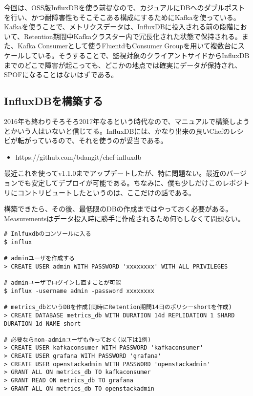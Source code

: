 今回は、OSS版InfluxDBを使う前提なので、カジュアルにDBへのダブルポストを行い、かつ耐障害性もそこそこある構成にするためにKafkaを使っている。Kafkaを使うことで、メトリクスデータは、InfluxDBに投入される前の段階において、Retention期間中Kafkaクラスター内で冗長化された状態で保持される。また、Kafka Consumerとして使うFluentdもConsumer Groupを用いて複数台にスケールしている。そうすることで、監視対象のクライアントサイドからInfluxDBまでのどこで障害が起こっても、どこかの地点では確実にデータが保持され、SPOFになることはないはずである。


\subsection{InfluxDBを構築する}
2016年も終わりそろそろ2017年なるという時代なので、マニュアルで構築しようとかいう人はいないと信じてる。InfluxDBには、かなり出来の良いChefのレシピが転がっているので、それを使うのが妥当である。


\begin{itemize}
	\item https://github.com/bdangit/chef-influxdb
\end{itemize}

最近これを使ってv1.1.0までアップデートしたが、特に問題ない。最近のバージョンでも安定してデプロイが可能である。ちなみに、僕も少しだけこのレポジトリにコントリビュートしたというのは、ここだけの話である。

構築できたら、その後、最低限のDBの作成まではやっておく必要がある。Measurementsはデータ投入時に勝手に作成されるため何もしなくて問題ない。

\begin{lstlisting}
# Inlfuxdbのコンソールに入る
$ influx

# adminユーザを作成する
> CREATE USER admin WITH PASSWORD 'xxxxxxxx' WITH ALL PRIVILEGES

# adminユーザでログインし直すことが可能
$ influx -username admin -password xxxxxxxx

# metrics_dbというDBを作成(同時にRetention期間14日のポリシーshortを作成)
> CREATE DATABASE metrics_db WITH DURATION 14d REPLIDATION 1 SHARD DURATION 1d NAME short

# 必要ならnon-adminユーザも作っておく(以下は1例)
> CREATE USER kafkaconsumer WITH PASSWORD 'kafkaconsumer'
> CREATE USER grafana WITH PASSWORD 'grafana'
> CREATE USER openstackadmin WITH PASSWORD 'openstackadmin'
> GRANT ALL ON metrics_db TO kafkaconsumer
> GRANT READ ON metrics_db TO grafana
> GRANT ALL ON metrics_db TO openstackadmin
\end{lstlisting}

